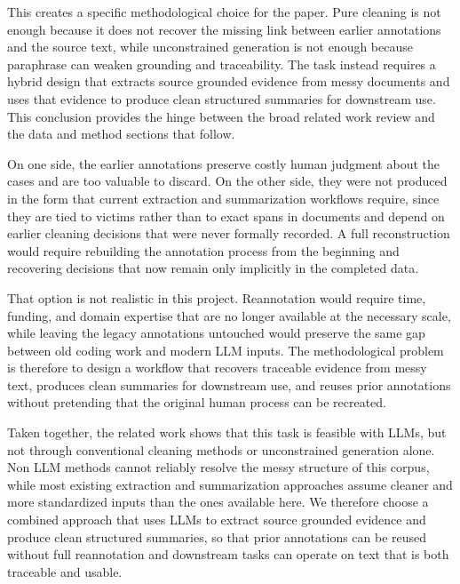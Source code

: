 \documentclass{article}
\begin{document}
This creates a specific methodological choice for the paper. Pure cleaning is not enough because it does not recover the missing link between earlier annotations and the source text, while unconstrained generation is not enough because paraphrase can weaken grounding and traceability. The task instead requires a hybrid design that extracts source grounded evidence from messy documents and uses that evidence to produce clean structured summaries for downstream use. This conclusion provides the hinge between the broad related work review and the data and method sections that follow.


On one side, the earlier annotations preserve costly human judgment about the cases and are too valuable to discard. On the other side, they were not produced in the form that current extraction and summarization workflows require, since they are tied to victims rather than to exact spans in documents and depend on earlier cleaning decisions that were never formally recorded. A full reconstruction would require rebuilding the annotation process from the beginning and recovering decisions that now remain only implicitly in the completed data.

That option is not realistic in this project. Reannotation would require time, funding, and domain expertise that are no longer available at the necessary scale, while leaving the legacy annotations untouched would preserve the same gap between old coding work and modern LLM inputs. The methodological problem is therefore to design a workflow that recovers traceable evidence from messy text, produces clean summaries for downstream use, and reuses prior annotations without pretending that the original human process can be recreated.

Taken together, the related work shows that this task is feasible with LLMs, but not through conventional cleaning methods or unconstrained generation alone. Non LLM methods cannot reliably resolve the messy structure of this corpus, while most existing extraction and summarization approaches assume cleaner and more standardized inputs than the ones available here. We therefore choose a combined approach that uses LLMs to extract source grounded evidence and produce clean structured summaries, so that prior annotations can be reused without full reannotation and downstream tasks can operate on text that is both traceable and usable.
\end{document}

